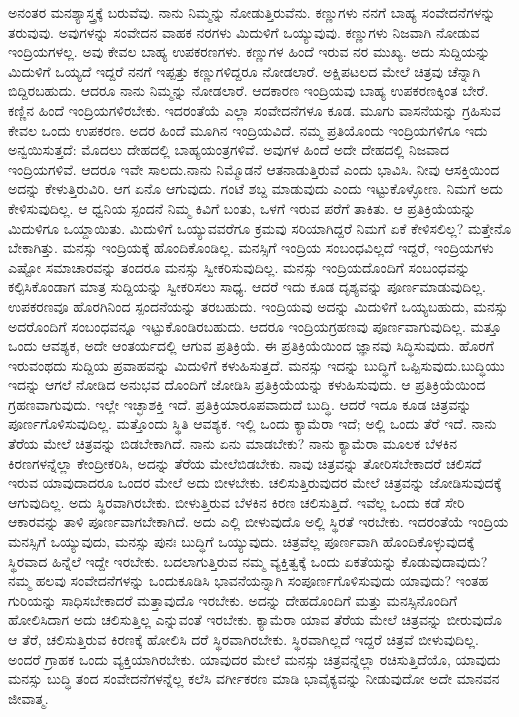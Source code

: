ಅನಂತರ ಮನಶ್ಯಾಸ್ತ್ರಕ್ಕೆ ಬರುವೆವು. ನಾನು ನಿಮ್ಮನ್ನು ನೋಡುತ್ತಿರುವೆನು. ಕಣ್ಣುಗಳು ನನಗೆ ಬಾಹ್ಯ ಸಂವೇದನೆಗಳನ್ನು ತರುವುವು. ಅವುಗಳನ್ನು ಸಂವೇದನ ವಾಹಕ ನರಗಳು ಮಿದುಳಿಗೆ ಒಯ್ಯುವುವು. ಕಣ್ಣುಗಳು ನಿಜವಾಗಿ ನೋಡುವ ಇಂದ್ರಿಯಗಳಲ್ಲ. ಅವು ಕೇವಲ ಬಾಹ್ಯ ಉಪಕರಣಗಳು. ಕಣ್ಣುಗಳ ಹಿಂದೆ ಇರುವ ನರ ಮುಖ್ಯ. ಅದು ಸುದ್ದಿಯನ್ನು ಮಿದುಳಿಗೆ ಒಯ್ಯದೆ ಇದ್ದರೆ ನನಗೆ ಇಪ್ಪತ್ತು ಕಣ್ಣುಗಳಿದ್ದರೂ ನೋಡಲಾರೆ. ಅಕ್ಷಿಪಟಲದ ಮೇಲೆ ಚಿತ್ರವು ಚೆನ್ನಾಗಿ ಬಿದ್ದಿರಬಹುದು. ಆದರೂ ನಾನು ನಿಮ್ಮನ್ನು ನೋಡಲಾರೆ. ಆದಕಾರಣ ಇಂದ್ರಿಯವು ಬಾಹ್ಯ ಉಪಕರಣಕ್ಕಿಂತ ಬೇರೆ. ಕಣ್ಣಿನ ಹಿಂದೆ ಇಂದ್ರಿಯಗಳಿರಬೇಕು. ಇದರಂತೆಯೆ ಎಲ್ಲಾ ಸಂವೇದನೆಗಳೂ ಕೂಡ. ಮೂಗು ವಾಸನೆಯನ್ನು ಗ್ರಹಿಸುವ ಕೇವಲ ಒಂದು ಉಪಕರಣ. ಅದರ ಹಿಂದೆ ಮೂಗಿನ ಇಂದ್ರಿಯವಿದೆ. ನಮ್ಮ ಪ್ರತಿಯೊಂದು ಇಂದ್ರಿಯಗಳಿಗೂ ಇದು ಅನ್ವಯಿಸುತ್ತದೆ: ಮೊದಲು ದೇಹದಲ್ಲಿ ಬಾಹ್ಯಯಂತ್ರಗಳಿವೆ. ಅವುಗಳ ಹಿಂದೆ ಅದೇ ದೇಹದಲ್ಲಿ ನಿಜವಾದ ಇಂದ್ರಿಯಗಳಿವೆ. ಆದರೂ ಇವೇ ಸಾಲದು.ನಾನು ನಿಮ್ಮೊಡನೆ ಆತನಾಡುತ್ತಿರುವೆ ಎಂದು ಭಾವಿಸಿ. ನೀವು ಆಸಕ್ತಿಯಿಂದ ಅದನ್ನು ಕೇಳುತ್ತಿರುವಿರಿ. ಆಗ ಏನೊ ಆಗುವುದು. ಗಂಟೆ ಶಬ್ದ ಮಾಡುವುದು ಎಂದು ಇಟ್ಟುಕೊಳ್ಳೋಣ. ನಿಮಗೆ ಅದು ಕೇಳಿಸುವುದಿಲ್ಲ. ಆ ಧ್ವನಿಯ ಸ್ಪಂದನೆ ನಿಮ್ಮ ಕಿವಿಗೆ ಬಂತು, ಒಳಗೆ ಇರುವ ಪರೆಗೆ ತಾಕಿತು. ಆ ಪ್ರತಿಕ್ರಿಯೆಯನ್ನು ಮಿದುಳಿಗೂ ಒಯ್ದಾಯಿತು. ಮಿದುಳಿಗೆ ಒಯ್ಯುವವರೆಗೂ ಕ್ರಮವು ಸರಿಯಾಗಿದ್ದರೆ ನಿಮಗೆ ಏಕೆ ಕೇಳಿಸಲಿಲ್ಲ? ಮತ್ತೇನೊ ಬೇಕಾಗಿತ್ತು. ಮನಸ್ಸು ಇಂದ್ರಿಯಕ್ಕೆ ಹೊಂದಿಕೊಂಡಿಲ್ಲ. ಮನಸ್ಸಿಗೆ ಇಂದ್ರಿಯ ಸಂಬಂಧವಿಲ್ಲದೆ ಇದ್ದರೆ, ಇಂದ್ರಿಯಗಳು ಎಷ್ಟೋ ಸಮಾಚಾರವನ್ನು ತಂದರೂ ಮನಸ್ಸು ಸ್ವೀಕರಿಸುವುದಿಲ್ಲ. ಮನಸ್ಸು ಇಂದ್ರಿಯದೊಂದಿಗೆ ಸಂಬಂಧವನ್ನು ಕಲ್ಪಿಸಿಕೊಂಡಾಗ ಮಾತ್ರ ಸುದ್ದಿಯನ್ನು ಸ್ವೀಕರಿಸಲು ಸಾಧ್ಯ. ಆದರೆ ಇದು ಕೂಡ ದೃಶ್ಯವನ್ನು ಪೂರ್ಣಮಾಡುವುದಿಲ್ಲ. ಉಪಕರಣವೂ ಹೊರಗಿನಿಂದ ಸ್ಪಂದನೆಯನ್ನು ತರಬಹುದು. ಇಂದ್ರಿಯವು ಅದನ್ನು ಮಿದುಳಿಗೆ ಒಯ್ಯಬಹುದು, ಮನಸ್ಸು ಅದರೊಂದಿಗೆ ಸಂಬಂಧವನ್ನೂ ಇಟ್ಟುಕೊಂಡಿರಬಹುದು. ಆದರೂ ಇಂದ್ರಿಯಗ್ರಹಣವು ಪೂರ್ಣವಾಗುವುದಿಲ್ಲ. ಮತ್ತೂ ಒಂದು ಆವಶ್ಯಕ, ಅದೇ ಆಂತರ್ಯದಲ್ಲಿ ಆಗುವ ಪ್ರತಿಕ್ರಿಯೆ. ಈ ಪ್ರತಿಕ್ರಿಯೆಯಿಂದ ಜ್ಞಾನವು ಸಿದ್ಧಿಸುವುದು. ಹೊರಗೆ ಇರುವಂಥದು ಸುದ್ದಿಯ ಪ್ರವಾಹವನ್ನು ಮಿದುಳಿಗೆ ಕಳುಹಿಸುತ್ತದೆ. ಮನಸ್ಸು ಇದನ್ನು ಬುದ್ಧಿಗೆ ಒಪ್ಪಿಸುವುದು.ಬುದ್ಧಿಯು ಇದನ್ನು ಆಗಲೆ ನೋಡಿದ ಅನುಭವ ದೊಂದಿಗೆ ಜೋಡಿಸಿ ಪ್ರತಿಕ್ರಿಯೆಯನ್ನು ಕಳುಹಿಸುವುದು. ಆ ಪ್ರತಿಕ್ರಿಯೆಯಿಂದ ಗ್ರಹಣವಾಗುವುದು. ಇಲ್ಲೇ ಇಚ್ಛಾಶಕ್ತಿ ಇದೆ. ಪ್ರತಿಕ್ರಿಯಾರೂಪವಾದುದೆ ಬುದ್ಧಿ. ಆದರೆ ಇದೂ ಕೂಡ ಚಿತ್ರವನ್ನು ಪೂರ್ಣಗೊಳಿಸುವುದಿಲ್ಲ. ಮತ್ತೊಂದು ಸ್ಥಿತಿ ಆವಶ್ಯಕ. ಇಲ್ಲಿ ಒಂದು ಕ್ಯಾಮೆರಾ ಇದೆ; ಅಲ್ಲಿ ಒಂದು ತೆರೆ ಇದೆ. ನಾನು ತೆರೆಯ ಮೇಲೆ ಚಿತ್ರವನ್ನು ಬಿಡಬೇಕಾಗಿದೆ. ನಾನು ಏನು ಮಾಡಬೇಕು? ನಾನು ಕ್ಯಾಮೆರಾ ಮೂಲಕ ಬೆಳಕಿನ ಕಿರಣಗಳನ್ನೆಲ್ಲಾ ಕೇಂದ್ರೀಕರಿಸಿ, ಅದನ್ನು ತೆರೆಯ ಮೇಲೆಬಿಡಬೇಕು. ನಾವು ಚಿತ್ರವನ್ನು ತೋರಿಸಬೇಕಾದರೆ ಚಲಿಸದೆ ಇರುವ ಯಾವುದಾದರೂ ಒಂದರ ಮೇಲೆ ಅದು ಬೀಳಬೇಕು. ಚಲಿಸುತ್ತಿರುವುದರ ಮೇಲೆ ಚಿತ್ರವನ್ನು ಜೋಡಿಸುವುದಕ್ಕೆ ಆಗುವುದಿಲ್ಲ. ಅದು ಸ್ಥಿರವಾಗಿರಬೇಕು. ಬೀಳುತ್ತಿರುವ ಬೆಳಕಿನ ಕಿರಣ ಚಲಿಸುತ್ತಿದೆ. ಇವೆಲ್ಲ ಒಂದು ಕಡೆ ಸೇರಿ ಆಕಾರವನ್ನು ತಾಳಿ ಪೂರ್ಣವಾಗಬೇಕಾಗಿದೆ. ಅದು ಎಲ್ಲಿ ಬೀಳುವುದೊ ಅಲ್ಲಿ ಸ್ಥಿರತೆ ಇರಬೇಕು. ಇದರಂತೆಯೆ ಇಂದ್ರಿಯ ಮನಸ್ಸಿಗೆ ಒಯ್ಯುವುದು, ಮನಸ್ಸು ಪುನಃ ಬುದ್ಧಿಗೆ ಒಯ್ಯುವುದು. ಚಿತ್ರವೆಲ್ಲ ಪೂರ್ಣವಾಗಿ ಹೊಂದಿಕೊಳ್ಳುವುದಕ್ಕೆ ಸ್ಥಿರವಾದ ಹಿನ್ನೆಲೆ ಇದ್ದೇ ಇರಬೇಕು. ಬದಲಾಗುತ್ತಿರುವ ನಮ್ಮ ವ್ಯಕ್ತಿತ್ವಕ್ಕೆ ಒಂದು ಏಕತೆಯನ್ನು ಕೊಡುವುದಾವುದು? ನಮ್ಮ ಹಲವು ಸಂವೇದನೆಗಳನ್ನು ಒಂದುಕೂಡಿಸಿ ಭಾವನೆಯನ್ನಾಗಿ ಸಂಪೂರ್ಣಗೊಳಿಸುವುದು ಯಾವುದು? ಇಂತಹ ಗುರಿಯನ್ನು ಸಾಧಿಸಬೇಕಾದರೆ ಮತ್ತಾವುದೊ ಇರಬೇಕು. ಅದನ್ನು ದೇಹದೊಂದಿಗೆ ಮತ್ತು ಮನಸ್ಸಿನೊಂದಿಗೆ ಹೋಲಿಸಿದಾಗ ಅದು ಚಲಿಸುತ್ತಿಲ್ಲ ಎನ್ನುವಂತೆ ಇರಬೇಕು. ಕ್ಯಾಮೆರಾ ಯಾವ ತೆರೆಯ ಮೇಲೆ ಚಿತ್ರವನ್ನು ಬೀರುವುದೊ ಆ ತೆರೆ, ಚಲಿಸುತ್ತಿರುವ ಕಿರಣಕ್ಕೆ ಹೋಲಿಸಿ ದರೆ ಸ್ಥಿರವಾಗಿರಬೇಕು. ಸ್ಥಿರವಾಗಿಲ್ಲದೆ ಇದ್ದರೆ ಚಿತ್ರವೆ ಬೀಳುವುದಿಲ್ಲ. ಅಂದರೆ ಗ್ರಾಹಕ ಒಂದು ವ್ಯಕ್ತಿಯಾಗಿರಬೇಕು. ಯಾವುದರ ಮೇಲೆ ಮನಸ್ಸು ಚಿತ್ರವನ್ನೆಲ್ಲಾ ರಚಿಸುತ್ತಿದೆಯೊ, ಯಾವುದು ಮನಸ್ಸು ಬುದ್ಧಿ ತಂದ ಸಂವೇದನೆಗಳನ್ನೆಲ್ಲ ಕಲೆಸಿ ವರ್ಗೀಕರಣ ಮಾಡಿ ಭಾವೈಕ್ಯವನ್ನು ನೀಡುವುದೋ ಅದೇ ಮಾನವನ ಜೀವಾತ್ಮ.

